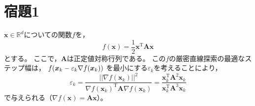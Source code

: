 \documentclass[class=jsarticle, crop=false, dvipdfmx, fleqn]{standalone}
\begin{document}
\section*{宿題1}

\(\bm{x} \in \mathbb{R}^d\)についての関数\(f\)を，
\begin{equation}
    f(\bm{x}) = \frac{1}{2} \bm{x}^\mathrm{T} \bm{A} \bm{x}
\end{equation}
とする。
ここで，\(\bm{A}\)は正定値対称行列である。
この\(f\)の厳密直線探索の最適なステップ幅は，
\(f\qty(\bm{x}_k - \varepsilon_k \nabla f(\bm{x}_k))\)
を最小にする\(\varepsilon_k\)を考えることにより，
\begin{equation}
    \varepsilon_k
        = \frac{||\nabla f(\bm{x}_k)||^2}{\nabla f(\bm{x}_k)^\mathrm{T} \bm{A} \nabla f(\bm{x}_k)}
        = \frac{\bm{x}_k^\mathrm{T} \bm{A}^2 \bm{x}_k}{\bm{x}_k^\mathrm{T} \bm{A}^3 \bm{x}_k}
\end{equation}
で与えられる（\(\nabla f(\bm{x}) = \bm{A} \bm{x} \)）。
\end{document}
